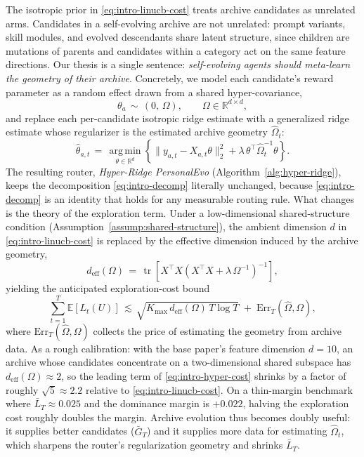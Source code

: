 \documentclass{article} %
\providecommand{\E}{\mathbb{E}}
\providecommand{\argmin}{\mathop{\mathrm{arg\,min}}\limits}
\begin{document}
The isotropic prior in \eqref{eq:intro-linucb-cost} treats archive candidates as unrelated arms. Candidates in a self-evolving archive are not unrelated: prompt variants, skill modules, and evolved descendants share latent structure, since children are mutations of parents and candidates within a category act on the same feature directions. Our thesis is a single sentence: \emph{self-evolving agents should meta-learn the geometry of their archive}. Concretely, we model each candidate's reward parameter as a random effect drawn from a shared hyper-covariance,
\begin{equation}
\label{eq:intro-random-effect}
\theta_a \,\sim\, (0,\, \Omega),
\qquad
\Omega \in \mathbb{R}^{d\times d},
\end{equation}
and replace each per-candidate isotropic ridge estimate with a generalized ridge estimate whose regularizer is the estimated archive geometry $\widehat\Omega_t$:
\begin{equation}
\label{eq:intro-hyper-ridge}
\widehat\theta_{a,t}
\,=\,
\argmin_{\theta \in \mathbb{R}^d}
\left\{
\|y_{a,t} - X_{a,t}\theta\|_2^2
+
\lambda\, \theta^\top \widehat\Omega_t^{-1}\theta
\right\}.
\end{equation}
The resulting router, \emph{Hyper-Ridge PersonalEvo} (Algorithm~\ref{alg:hyper-ridge}), keeps the decomposition \eqref{eq:intro-decomp} literally unchanged, because \eqref{eq:intro-decomp} is an identity that holds for any measurable routing rule. What changes is the theory of the exploration term. Under a low-dimensional shared-structure condition (Assumption~\ref{assump:shared-structure}), the ambient dimension $d$ in \eqref{eq:intro-linucb-cost} is replaced by the effective dimension induced by the archive geometry,
\begin{equation}
\label{eq:intro-deff}
d_{\mathrm{eff}}(\Omega)
\,=\,
\operatorname{tr}\!\left[
X^\top X
\left(X^\top X + \lambda\,\Omega^{-1}\right)^{-1}
\right],
\end{equation}
yielding the anticipated exploration-cost bound
\begin{equation}
\label{eq:intro-hyper-cost}
\sum_{t=1}^{T}\E[L_t(U)]
\,\lesssim\,
\sqrt{K_{\max}\, d_{\mathrm{eff}}(\Omega)\, T \log T}
\;+\;
\mathrm{Err}_T(\widehat\Omega, \Omega),
\end{equation}
where $\mathrm{Err}_T(\widehat\Omega,\Omega)$ collects the price of estimating the geometry from archive data. As a rough calibration: with the base paper's feature dimension $d = 10$, an archive whose candidates concentrate on a two-dimensional shared subspace has $d_{\mathrm{eff}}(\Omega) \approx 2$, so the leading term of \eqref{eq:intro-hyper-cost} shrinks by a factor of roughly $\sqrt{5} \approx 2.2$ relative to \eqref{eq:intro-linucb-cost}. On a thin-margin benchmark where $\bar L_T \approx 0.025$ and the dominance margin is $+0.022$, halving the exploration cost roughly doubles the margin. Archive evolution thus becomes doubly useful: it supplies better candidates ($\bar G_T$) and it supplies more data for estimating $\widehat\Omega_t$, which sharpens the router's regularization geometry and shrinks $\bar L_T$.
\end{document}
